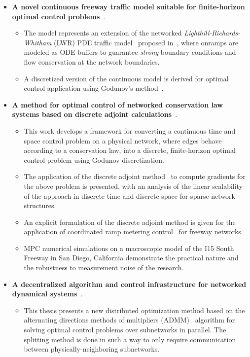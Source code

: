 \begin{itemize}
	\item \textbf{A novel continuous freeway traffic model suitable for finite-horizon optimal control problems}~\cite{delle2014pde,Reilly2013b}.
	\begin{itemize}
		\item The model represents an extension of the networked \emph{Lighthill-Richards-Whitham} (LWR) PDE traffic model~\cite{lighthill1955kinematic,richards1956shock} proposed in~\cite{garavello2006traffic}, where onramps are modeled as ODE buffers to guarantee \emph{strong} boundary conditions and flow conservation at the network boundaries.
		\item A discretized version of the continuous model is derived for optimal control application using Godunov's method~\cite{godunov1959,lebacque1996godunov}.
	\end{itemize}
	\item \textbf{A method for optimal control of networked conservation law systems based on discrete adjoint calculations}~\cite{Reilly2013b,Samaranayake2014}.
	\begin{itemize}
		\item This work develops a framework for converting a continuous time and space control problem on a physical network, where edges behave according to a conservation law, into a discrete, finite-horizon optimal control problem using Godunov discretization.
		\item The application of the discrete adjoint method~\cite{Giles2000,Duffy2009,Apice2010Modeling,Gugat2005} to compute gradients for the above problem is presented, with an analysis of the linear scalability of the approach in discrete time and discrete space for sparse network structures.
		\item An explicit formulation of the discrete adjoint method is given for the application of coordinated ramp metering control~\cite{Papageorgiou1991,Frejo2011,Kotsialos2004,gomes2006optimal} for freeway networks.
		\item MPC numerical simulations on a macroscopic model of the I15 South Freeway in San Diego, California demonstrate the practical nature and the robustness to measurement noise of the research.
	\end{itemize}
	\item \textbf{A decentralized algorithm and control infrastructure for networked dynamical systems}~\cite{Reilly2014b}.
	\begin{itemize}
		\item This thesis presents a new distributed optimization method based on the alternating directions methods of multipliers (ADMM)~\cite{Boyd2010a,gabay1976dual,mota2012distributed} algorithm for solving  optimal control problems over subnetworks in parallel. The splitting method is done in such a way to only require communication between physically-neighboring subnetworks.

\end{itemize}
\end{itemize}
